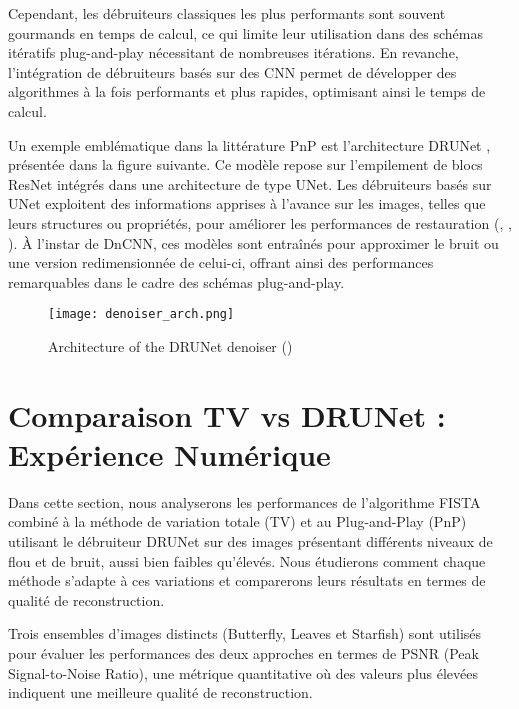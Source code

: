 \documentclass[a4paper, 12pt]{report} %
\begin{document}
Cependant, les débruiteurs classiques les plus performants sont souvent gourmands en temps de calcul, ce qui limite leur utilisation dans des schémas itératifs plug-and-play nécessitant de nombreuses itérations. En revanche, l’intégration de débruiteurs basés sur des CNN permet de développer des algorithmes à la fois performants et plus rapides, optimisant ainsi le temps de calcul.

Un exemple emblématique dans la littérature PnP est l’architecture DRUNet \cite{zhang2021plug}, présentée dans la figure suivante. Ce modèle repose sur l’empilement de blocs ResNet \cite{he2016deep} intégrés dans une architecture de type UNet. Les débruiteurs basés sur UNet exploitent des informations apprises à l’avance sur les images, telles que leurs structures ou propriétés, pour améliorer les performances de restauration (\cite{ho2020denoising}, \cite{song2019generative}, \cite{song2021train}). À l’instar de DnCNN, ces modèles sont entraînés pour approximer le bruit ou une version redimensionnée de celui-ci, offrant ainsi des performances remarquables dans le cadre des schémas plug-and-play.

\begin{figure}[H]
\centering
\begin{adjustbox}{width=1.54 \linewidth, totalheight=0.3 \textheight, angle=0, scale= 0.65, minipage= 2\linewidth, margin= 0}
\texttt{[image: denoiser\_arch.png]}
\end{adjustbox}
\caption{Architecture of the DRUNet denoiser (\cite{zhang2021plug})} 
    
    \label{fig:3}
\end{figure}   


\section{Comparaison TV vs DRUNet : Expérience Numérique} 

Dans cette section, nous analyserons les performances de l'algorithme FISTA combiné à la méthode de variation totale (TV) et au Plug-and-Play (PnP) utilisant le débruiteur DRUNet sur des images présentant différents niveaux de flou et de bruit, aussi bien faibles qu’élevés. Nous étudierons comment chaque méthode s’adapte à ces variations et comparerons leurs résultats en termes de qualité de reconstruction.

 Trois ensembles d’images distincts (Butterfly, Leaves et Starfish) sont utilisés pour évaluer les performances des deux approches en termes de PSNR (Peak Signal-to-Noise Ratio), une métrique quantitative où des valeurs plus élevées indiquent une meilleure qualité de reconstruction.
 
\end{document}
